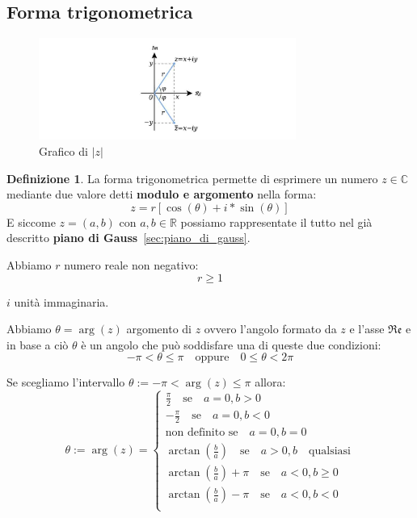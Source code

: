 \documentclass{article}
\theoremstyle{definition}
\newtheorem{definition}{Definizione}[section]
\begin{document}
\subsection{Forma trigonometrica}\label{sec:forma_trigonometrica}
\begin{figure}[H]
        \centering
                \includegraphics[width=0.75\textwidth]{forma_goniometrica.jpg}
                \caption{Grafico di $ |z| $}\label{fig:forma_goniometrica}
\end{figure}

\begin{definition}
        
La forma trigonometrica permette di esprimere un numero $ z \in \mathbb{C} $ mediante due valore detti \textbf{modulo e argomento} nella forma:
\begin{equation*}
        \boxed{z = r[\cos(\theta) + i*\sin(\theta)]}
\end{equation*}
E siccome $  z = (a, b) $ con $ a,b \in \mathbb{R} $ possiamo rappresentate il tutto nel già descritto \textbf{piano di Gauss}~\ref{sec:piano_di_gauss}. 
\end{definition}

Abbiamo $ r $ numero reale non negativo:
\begin{equation*}
        r \ge 1
\end{equation*}

$ i $ unità immaginaria. \newline 

Abbiamo $\boxed{\theta = \arg(z)}$ argomento di $ z $ ovvero l'angolo formato da $ z $  e l'asse $\mathfrak{Re}$ e in base a ciò $\theta$ è un angolo che può soddisfare una di queste due condizioni:
\begin{equation*}
        -\pi < \theta \le \pi \quad \mbox{oppure} \quad 0 \le \theta < 2\pi
\end{equation*}

\begin{tcolorbox}
Se scegliamo l'intervallo $ \theta := -\pi < \arg(z) \le \pi $ allora:
\[ \theta := \arg(z) =
\begin{cases}
        \frac{\pi}{2} \quad \mbox{se} \quad a=0, b>0 \\ 
        -\frac{\pi}{2} \quad \mbox{se} \quad a=0, b<0 \\ 
        \mbox{non definito se} \quad a=0, b=0 \\ 
        \arctan(\frac{b}{a}) \quad \mbox{se} \quad a>0, b \quad \mbox{qualsiasi} \\ 
        \arctan(\frac{b}{a}) + \pi \quad \mbox{se} \quad a<0, b \ge 0 \\ 
        \arctan(\frac{b}{a}) - \pi \quad \mbox{se} \quad a<0, b<0 \\ 
\end{cases}
\]
\end{tcolorbox}
\end{document}

